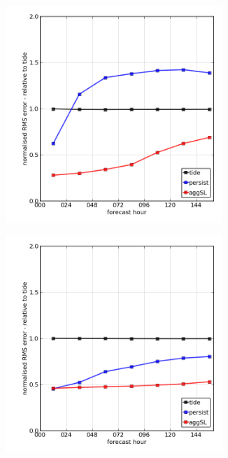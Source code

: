 \begin{figure}[!hbt] \centering
    \begin{subfigure}{0.30\textwidth}
    \includegraphics[width=0.9\textwidth]{figures/plots/0013_rms_growth.png}
    \caption{}
    \end{subfigure}
    \begin{subfigure}{0.30\textwidth}
    \includegraphics[width=0.9\textwidth]{figures/plots/0043_rms_growth.png}

\end{subfigure}
\end{figure}
